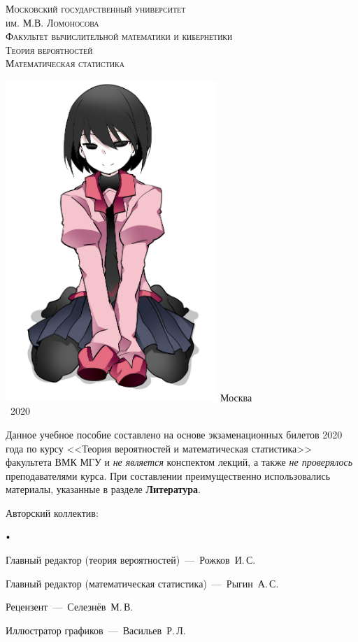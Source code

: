 \documentclass[oneside,final,14pt]{extreport}
\theoremstyle{plain}
\theoremstyle{definition}
\theoremstyle{named}
\newcommand\sbullet[1][.5]{\mathbin{\vcenter{\hbox{\scalebox{#1}{$\bullet$}}}}}
\newenvironment{compactlist}{
\begin{list}{{$\sbullet[.75]$}}{
\setlength\partopsep{0pt}
\setlength\parskip{0pt}
\setlength\parsep{0pt}
\setlength\topsep{0pt}
\setlength\itemsep{0pt}
}
}{
\end{list}
}
\begin{document}
\begin{titlepage}
    \centering
    \vfill
    {\scshape\large
        Московский государственный университет\\
        им. М.В. Ломоносова\\
        Факультет вычислительной математики и кибернетики\\
   }
    \vskip1cm
    {\scshape\huge
        Теория вероятностей\\
        Математическая статистика\\
   }

    \vfill
    \includegraphics[width=8cm]{pic.png}
    \vfill
    {\upshape\large
        Москва\\
        ~2020
   }
\end{titlepage}

\newpage
Данное учебное пособие составлено на основе экзаменационных билетов 2020 года по курсу <<Теория вероятностей и математическая статистика>> факультета ВМК МГУ и \textit{не является} конспектом лекций, а также \textit{не проверялось} преподавателями курса. При составлении преимущественно использовались материалы, указанные в разделе \textbf{Литература}.

\vspace{5mm}

Авторский коллектив:
\begin{compactlist}
    \item Главный редактор (теория вероятностей)~---~Рожков~И.\,С.
    \item Главный редактор (математическая статистика)~---~Рыгин~А.\,С.
    \item Рецензент~---~Селезнёв~М.\,В.
    \item Иллюстратор графиков~---~Васильев~Р.\,Л.
\end{compactlist}
\end{document}
